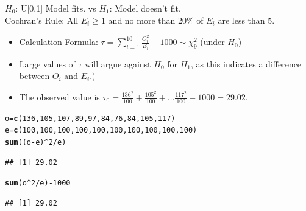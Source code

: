 \documentclass[t,xcolor=pdftex,dvipsnames,table]{beamer}
\makeatletter
\newcommand{\hlnum}[1]{\textcolor[rgb]{0.686,0.059,0.569}{#1}}%
\newcommand{\hlopt}[1]{\textcolor[rgb]{0,0,0}{#1}}%
\newcommand{\hlstd}[1]{\textcolor[rgb]{0.345,0.345,0.345}{#1}}%
\newcommand{\hlkwb}[1]{\textcolor[rgb]{0.69,0.353,0.396}{#1}}%
\newcommand{\hlkwd}[1]{\textcolor[rgb]{0.737,0.353,0.396}{\textbf{#1}}}%
\newenvironment{kframe}{%
 \def\at@end@of@kframe{}%
 \ifinner\ifhmode%
  \def\at@end@of@kframe{\end{minipage}}%
  \begin{minipage}{\columnwidth}%
 \fi\fi%
 \def\FrameCommand##1{\hskip\@totalleftmargin \hskip-\fboxsep
 \colorbox{shadecolor}{##1}\hskip-\fboxsep
     \hskip-\linewidth \hskip-\@totalleftmargin \hskip\columnwidth}%
 \MakeFramed {\advance\hsize-\width
   \@totalleftmargin\z@ \linewidth\hsize
   \@setminipage}}%
 {\par\unskip\endMakeFramed%
 \at@end@of@kframe}
\newenvironment{knitrout}{}{} %
\makeatother
\begin{document}
\begin{frame}[fragile]{}

 $H_{0}$: U[0,1] Model fits. vs $H_{1}$: Model doesn't fit. \\

 Cochran's Rule: All $E_{i} \geq 1$ and no more than 20\% of $E_{i}$ are less than 5. 

\begin{itemize}
\item Calculation Formula: $\tau = \sum_{i=1}^{10} \frac{O_{i}^2}{E_{i}} - 1000 \sim \chi^2_{9}$ (under $H_{0}$)
\item Large values of $\tau$ will argue against $H_{0}$ for $H_{1}$, as this indicates a difference between $O_{i}$ and $E_{i}$.)
\item The observed value is $\tau_{0} = \frac{136^2}{100} + \frac{105^2}{100} + \ldots \frac{117^2}{100} - 1000 = 29.02$. 
\end{itemize}

\begin{knitrout}
\color{fgcolor}\begin{kframe}
\begin{alltt}
\hlstd{o}\hlkwb{=}\hlkwd{c}\hlstd{(}\hlnum{136}\hlstd{,}\hlnum{105}\hlstd{,}\hlnum{107}\hlstd{,}\hlnum{89}\hlstd{,}\hlnum{97}\hlstd{,}\hlnum{84}\hlstd{,}\hlnum{76}\hlstd{,}\hlnum{84}\hlstd{,}\hlnum{105}\hlstd{,}\hlnum{117}\hlstd{)}
\hlstd{e}\hlkwb{=}\hlkwd{c}\hlstd{(}\hlnum{100}\hlstd{,}\hlnum{100}\hlstd{,}\hlnum{100}\hlstd{,}\hlnum{100}\hlstd{,}\hlnum{100}\hlstd{,}\hlnum{100}\hlstd{,}\hlnum{100}\hlstd{,}\hlnum{100}\hlstd{,}\hlnum{100}\hlstd{,}\hlnum{100}\hlstd{)}
\hlkwd{sum}\hlstd{((o}\hlopt{-}\hlstd{e)}\hlopt{^}\hlnum{2}\hlopt{/}\hlstd{e)}
\end{alltt}
\begin{verbatim}
## [1] 29.02
\end{verbatim}
\begin{alltt}
\hlkwd{sum}\hlstd{(o}\hlopt{^}\hlnum{2}\hlopt{/}\hlstd{e)} \hlopt{-} \hlnum{1000}
\end{alltt}
\begin{verbatim}
## [1] 29.02
\end{verbatim}
\end{kframe}
\end{knitrout}
\end{frame} 
\end{document}
